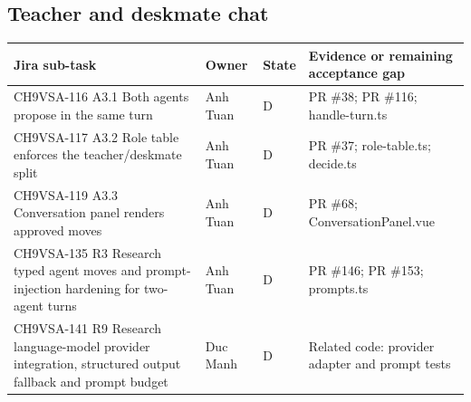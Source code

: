 \documentclass[11pt,a4paper]{article}
\begin{document}
\subsection{Teacher and deskmate chat}
{\small
\begin{longtable}{>{\raggedright\arraybackslash}p{}>{\raggedright\arraybackslash}p{}>{\raggedright\arraybackslash}p{}>{\raggedright\arraybackslash}p{}}
\toprule
\textbf{Jira sub-task} & \textbf{Owner} & \textbf{State} & \textbf{Evidence or remaining acceptance gap} \\
\midrule
\endhead
CH9VSA-116 \newline A3.1 Both agents propose in the same turn & Anh Tuan & D & PR \#38; PR \#116; handle-turn.ts \\
CH9VSA-117 \newline A3.2 Role table enforces the teacher/deskmate split & Anh Tuan & D & PR \#37; role-table.ts; decide.ts \\
CH9VSA-119 \newline A3.3 Conversation panel renders approved moves & Anh Tuan & D & PR \#68; ConversationPanel.vue \\
CH9VSA-135 \newline R3 Research typed agent moves and prompt-injection hardening for two-agent turns & Anh Tuan & D & PR \#146; PR \#153; prompts.ts \\
CH9VSA-141 \newline R9 Research language-model provider integration, structured output fallback and prompt budget & Duc Manh & D & Related code: provider adapter and prompt tests \\
\bottomrule
\end{longtable}}
\end{document}
